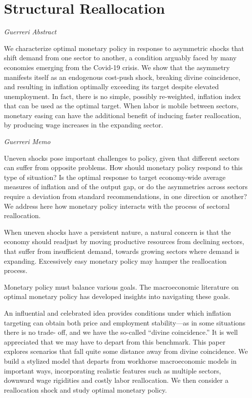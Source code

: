 \documentclass[
]{book}
\begin{document}
\hypertarget{structural-reallocation}{%
\section{Structural Reallocation}\label{structural-reallocation}}

\emph{Guerreri Abstract}

We characterize optimal monetary policy in response to asymmetric shocks that shift
demand from one sector to another, a condition arguably faced by many economies
emerging from the Covid-19 crisis. We show that the asymmetry manifests itself as an
endogenous cost-push shock, breaking divine coincidence, and resulting in inflation
optimally exceeding its target despite elevated unemployment. In fact, there is no
simple, possibly re-weighted, inflation index that can be used as the optimal target.
When labor is mobile between sectors, monetary easing can have the additional benefit
of inducing faster reallocation, by producing wage increases in the expanding sector.

\emph{Guerreri Memo}

Uneven shocks pose important challenges to policy,
given that different sectors can suffer from opposite problems.
How should monetary policy respond to
this type of situation? Is the optimal response to target economy-wide average measures
of inflation and of the output gap, or do the asymmetries across sectors require a deviation
from standard recommendations, in one direction or another?
We address here how monetary policy interacts with the process
of sectoral reallocation.

When uneven shocks have a persistent nature, a natural concern
is that the economy should readjust by moving productive resources from declining
sectors, that suffer from insufficient demand, towards growing sectors where demand is
expanding.
Excessively easy monetary policy may
hamper the reallocation process.

Monetary policy must balance various goals. The macroeconomic
literature on optimal monetary policy has developed insights into navigating these goals.

An influential and celebrated idea provides conditions under which inflation targeting
can obtain both price and employment stability---as in some situations there is no trade-
off, and we have the so-called ``divine coincidence.'' It is well appreciated that we may
have to depart from this benchmark. This paper explores scenarios that fall quite some
distance away from divine coincidence. We build a stylized model that departs from
workhorse macroeconomic models in important ways, incorporating realistic features
such as multiple sectors, downward wage rigidities and costly labor reallocation. We then
consider a reallocation shock and study optimal monetary policy.
\end{document}
